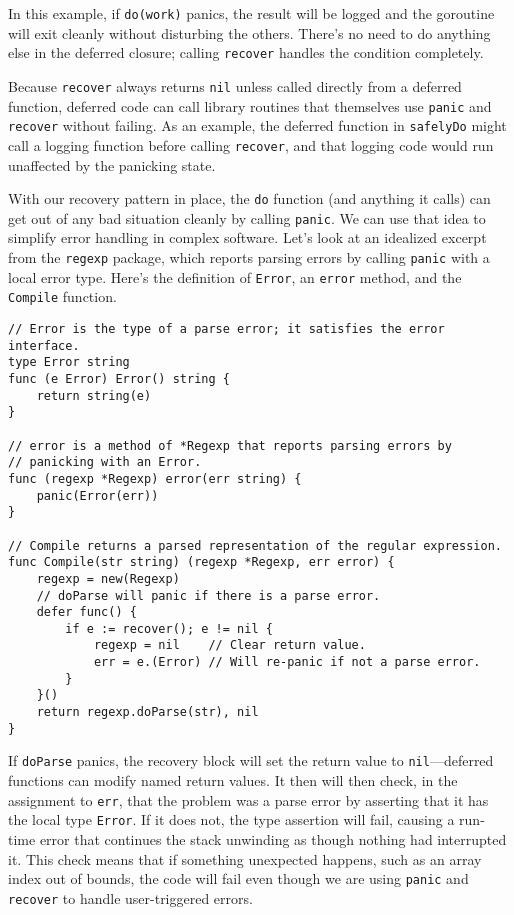 In this example, if \texttt{do(work)} panics, the result will be logged
and the goroutine will exit cleanly without disturbing the others.
There's no need to do anything else in the deferred closure; calling
\texttt{recover} handles the condition completely.

Because \texttt{recover} always returns \texttt{nil} unless called
directly from a deferred function, deferred code can call library
routines that themselves use \texttt{panic} and \texttt{recover} without
failing. As an example, the deferred function in \texttt{safelyDo} might
call a logging function before calling \texttt{recover}, and that
logging code would run unaffected by the panicking state.

With our recovery pattern in place, the \texttt{do} function (and
anything it calls) can get out of any bad situation cleanly by calling
\texttt{panic}. We can use that idea to simplify error handling in
complex software. Let's look at an idealized excerpt from the
\texttt{regexp} package, which reports parsing errors by calling
\texttt{panic} with a local error type. Here's the definition of
\texttt{Error}, an \texttt{error} method, and the \texttt{Compile}
function.

\begin{Verbatim}[frame=single]
// Error is the type of a parse error; it satisfies the error interface.
type Error string
func (e Error) Error() string {
    return string(e)
}

// error is a method of *Regexp that reports parsing errors by
// panicking with an Error.
func (regexp *Regexp) error(err string) {
    panic(Error(err))
}

// Compile returns a parsed representation of the regular expression.
func Compile(str string) (regexp *Regexp, err error) {
    regexp = new(Regexp)
    // doParse will panic if there is a parse error.
    defer func() {
        if e := recover(); e != nil {
            regexp = nil    // Clear return value.
            err = e.(Error) // Will re-panic if not a parse error.
        }
    }()
    return regexp.doParse(str), nil
}
\end{Verbatim}

If \texttt{doParse} panics, the recovery block will set the return value
to \texttt{nil}---deferred functions can modify named return values. It
then will then check, in the assignment to \texttt{err}, that the
problem was a parse error by asserting that it has the local type
\texttt{Error}. If it does not, the type assertion will fail, causing a
run-time error that continues the stack unwinding as though nothing had
interrupted it. This check means that if something unexpected happens,
such as an array index out of bounds, the code will fail even though we
are using \texttt{panic} and \texttt{recover} to handle user-triggered
errors.

